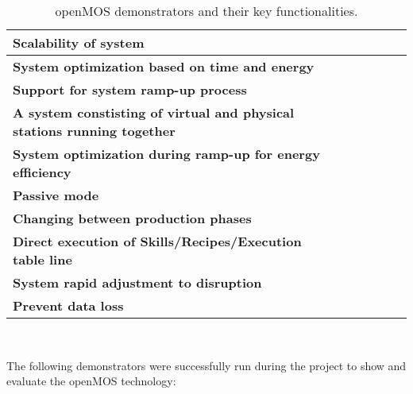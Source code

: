 \begin{table*}
\begin{tabular}{p{10cm}|c|c|c|c|c}
		\hline
		\textbf{Scalability of system } &  &  & \checkmark &  &  \\
		\hline
		\textbf{System optimization based on time and energy} &  &  & \checkmark &  &  \\
		\hline
		\textbf{Support for system ramp-up process } &  &  & \checkmark &  &  \\
		\hline
		\textbf{A system constisting of virtual and physical stations running together} &  & \checkmark & \checkmark &  & \checkmark \\
		\hline
		\textbf{System optimization during ramp-up for energy efficiency} & \checkmark & \checkmark & \checkmark & \checkmark & \checkmark \\
		\hline
		\textbf{Passive mode} &  &  &  & \checkmark &  \\
		\hline
		\textbf{Changing between production phases} & \checkmark & \checkmark & \checkmark &  & \checkmark \\
		\hline
		\textbf{Direct execution of Skills/Recipes/Execution table line} & \checkmark & \checkmark & \checkmark &  & \checkmark \\
		\hline
		\textbf{System rapid adjustment to disruption} & \checkmark & \checkmark & \checkmark &  &  \\
		\hline
		\textbf{Prevent data loss} & \checkmark & \checkmark & \checkmark & \checkmark & \checkmark \\
		\hline
	\end{tabular}
	\\
	\caption{openMOS demonstrators and their key functionalities.}
	\label{tab:demos}
\end{table*}

The following demonstrators were successfully run during the project to show and evaluate the \gls{openMOS} technology:

